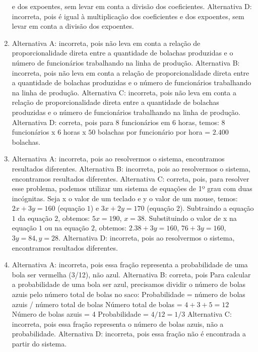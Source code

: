 \begin{enumerate}
e dos expoentes, sem levar em conta a divisão dos coeficientes.
Alternativa D: incorreta, pois é igual à multiplicação dos coeficientes
e dos expoentes, sem levar em conta a divisão dos expoentes.
\item Alternativa A: incorreta, pois não leva em conta a relação de
proporcionalidade direta entre a quantidade de bolachas produzidas e o
número de funcionários trabalhando na linha de produção.
Alternativa B: incorreta, pois não leva em conta a relação de
proporcionalidade direta entre a quantidade de bolachas produzidas e o
número de funcionários trabalhando na linha de produção.
Alternativa C: incorreta, pois não leva em conta a relação de
proporcionalidade direta entre a quantidade de bolachas produzidas e o
número de funcionários trabalhando na linha de produção.
Alternativa D: correta, pois para $8$ funcionários em $6$ horas, temos: $8$
funcionários x $6$ horas x $50$ bolachas por funcionário por hora = $2.400$
bolachas.
\item Alternativa A: incorreta, pois ao resolvermos o sistema, encontramos
resultados diferentes.
Alternativa B: incorreta, pois ao resolvermos o sistema, encontramos
resultados diferentes.
Alternativa C: correta, pois, para resolver esse problema, podemos
utilizar um sistema de equações de 1º grau com duas incógnitas. Seja x o
valor de um teclado e y o valor de um mouse, temos: $2x + 3y = 160$ (equação $1$) e $3x + 2y = 170$ (equação $2$). Subtraindo a equação $1$ da equação $2$, obtemos: $5x = 190$, $x = 38$. Substituindo o valor de x na equação $1$ ou na equação $2$, obtemos: $2.38 + 3y = 160$, $76 + 3y = 160$, $3y = 84, y = 28$. 
Alternativa D: incorreta, pois ao resolvermos o sistema, encontramos
resultados diferentes.
\item Alternativa A: incorreta, pois essa fração representa a probabilidade de
uma bola ser vermelha (3/12), não azul.
Alternativa B: correta, pois Para calcular a probabilidade de uma bola
ser azul, precisamos dividir o número de bolas azuis pelo número total
de bolas no saco: Probabilidade = número de bolas azuis / número total
de bolas Número total de bolas = $4 + 3 + 5 = 12$ Número de bolas azuis =
4 Probabilidade = $4/12 = 1/3$
Alternativa C: incorreta, pois essa fração representa o número de bolas
azuis, não a probabilidade.
Alternativa D: incorreta, pois essa fração não é encontrada a partir do
sistema.

\end{enumerate}